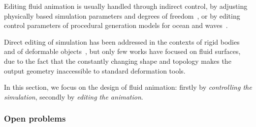 Editing fluid animation is usually handled through indirect control, by adjusting physically based simulation parameters and degrees of freedom~\cite{stam1999,ihmsen2014}, or by editing control parameters of procedural generation models for ocean and waves~\cite{Fournier1986,hinsinger2002,Tessendorf2004,jeschke2015water}. 

Direct editing of simulation has been addressed in the contexts of rigid bodies and of deformable objects~\cite{Chenney2000,wojtan2006keyframe,Twigg2007,Barbic2009,Barbic2012,Schulz2014,Li2014}, but only few works have focused on fluid surfaces, due to the fact that the constantly changing shape and topology makes the output geometry inaccessible to standard deformation tools.

In this section, we focus on the design of fluid animation: firstly by \emph{controlling the simulation}, secondly by \emph{editing the animation}. 

\subsubsection{Open problems}